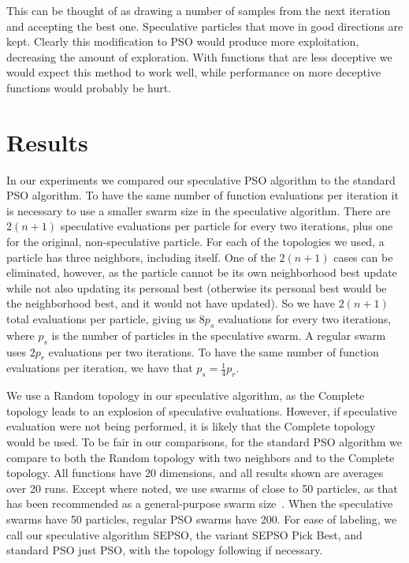 \documentclass[conference,letterpaper]{IEEEtran}
\begin{document}
This can be thought of as drawing a number of samples from the next iteration
and accepting the best one.  Speculative particles that move in good directions
are kept.  Clearly this modification to PSO would produce more exploitation,
decreasing the amount of exploration.  With functions that are less deceptive
we would expect this method to work well, while performance on more deceptive
functions would probably be hurt.

\section{Results}
\label{sec:results}

In our experiments we compared our speculative PSO algorithm to the standard
PSO algorithm.  To have the same number of function evaluations per iteration
it is necessary to use a smaller swarm size in the speculative algorithm.
There are $2(n+1)$ speculative evaluations per particle for every two
iterations, plus one for the original, non-speculative particle.  For each of
the topologies we used, a particle has three neighbors, including itself.  One
of the $2(n+1)$ cases can be eliminated, however, as the particle cannot be its
own neighborhood best update while not also updating its personal best
(otherwise its personal best would be the neighborhood best, and it would not
have updated).  So we have $2(n+1)$ total evaluations per particle, giving us
$8p_s$ evaluations for every two iterations, where $p_s$ is the number of
particles in the speculative swarm.  A regular swarm uses $2p_r$ evaluations
per two iterations.  To have the same number of function evaluations per
iteration, we have that $p_s = \frac{1}{4}p_r$.

We use a Random topology in our speculative algorithm, as the Complete topology
leads to an explosion of speculative evaluations.  However, if speculative
evaluation were not being performed, it is likely that the Complete topology
would be used.  To be fair in our comparisons, for the standard PSO algorithm
we compare to both the Random topology with two neighbors and to the Complete
topology.  All functions have 20 dimensions, and all results shown are averages
over 20 runs.  Except where noted, we use swarms of close to 50 particles, as
that has been recommended as a general-purpose swarm size~\cite{bratton-sis07}.
When the speculative swarms have 50 particles, regular PSO swarms have 200.
For ease of labeling, we call our speculative algorithm SEPSO, the variant
SEPSO Pick Best, and standard PSO just PSO, with the topology following if
necessary.
\end{document}
